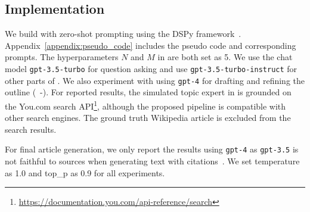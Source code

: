 \subsection{\system Implementation}
We build \system with zero-shot prompting using the DSPy framework~\citep{khattab2023dspy}. Appendix~\ref{appendix:pseudo_code} includes the pseudo code and corresponding prompts. The hyperparameters $N$ and $M$ in \system are both set as 5. We use the chat model \texttt{gpt-3.5-turbo} for question asking and use \texttt{gpt-3.5-turbo-instruct} for other parts of \system. We also experiment with using \texttt{gpt-4} for drafting and refining the outline (~-). For reported results, the simulated topic expert in \system is grounded on the You.com search API\footnote{\url{https://documentation.you.com/api-reference/search}}, although the proposed pipeline is compatible with other search engines. The ground truth Wikipedia article is excluded from the search results.

For final article generation, we only report the results using \texttt{gpt-4} as \texttt{gpt-3.5} is not faithful to sources when generating text with citations~\citep{gao-etal-2023-enabling}. We set temperature as 1.0 and top\_p as 0.9 for all experiments.



